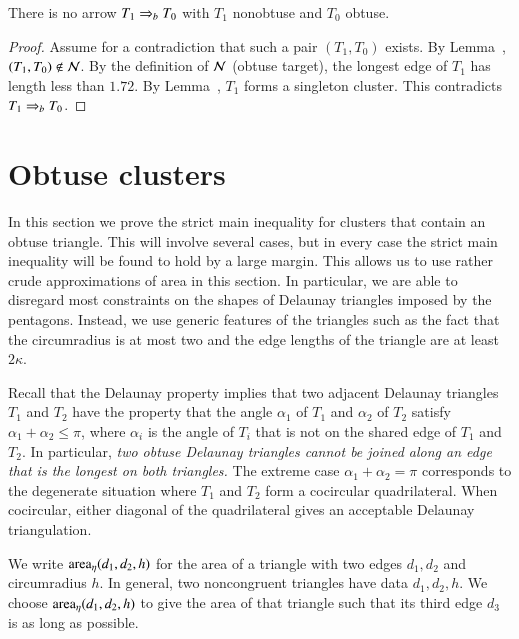 \begin{lemma} 
  There is no arrow $T_1 \Rightarrow_{b} T_0$ with $T_1$ nonobtuse and $T_0$
  obtuse.
\end{lemma}

\begin{proof}  
  Assume for a contradiction that such a pair $(T_1,T_0)$ exists.  By
  Lemma~, $(T_1,T_0)\not\in\mathcal N$.  By the definition of
  $\mathcal N$ (obtuse target), the longest edge of $T_1$ has length less than
  $1.72$.  By Lemma~, $T_1$ forms a singleton
  cluster.  This contradicts $T_1\Rightarrow_{b} T_0$.
\end{proof}


\section{Obtuse clusters}

In this section we prove the strict main inequality for clusters that
contain an obtuse triangle.  This will involve several cases, but in
every case the strict main inequality will be found to hold by a large
margin.  This allows us to use rather crude approximations of
area in this section.  In particular, we are able to disregard most
constraints on the shapes of Delaunay triangles imposed by the
pentagons.  Instead, we use generic features of the triangles such as
the fact that the circumradius is at most two and the edge lengths of
the triangle are at least $2\kappa$.


\begin{remark}
  Recall that the Delaunay property implies that two adjacent Delaunay
  triangles $T_1$ and $T_2$ have the property that the angle
  $\alpha_1$ of $T_1$ and $\alpha_2$ of $T_2$ satisfy $\alpha_1 +
  \alpha_2\le \pi$, where $\alpha_i$ is the angle of $T_i$ that is not
  on the shared edge of $T_1$ and $T_2$.  In particular, {\it two
    obtuse Delaunay triangles cannot be joined along an edge that is
    the longest on both triangles.}  The extreme case
  $\alpha_1+\alpha_2=\pi$ corresponds to the degenerate situation
  where $T_1$ and $T_2$ form a cocircular quadrilateral. When
  cocircular, either diagonal of the quadrilateral gives an acceptable
  Delaunay triangulation.
\end{remark}



We write ${\operatorname{area}}_\eta(d_1,d_2,h)$ for the area of a triangle with two edges
$d_1,d_2$ and circumradius $h$.  In general, two noncongruent
triangles have data $d_1,d_2,h$.  We choose ${\operatorname{area}}_\eta(d_1,d_2,h)$ to
give the area of that triangle such that its third edge $d_3$ is as
long as possible.

